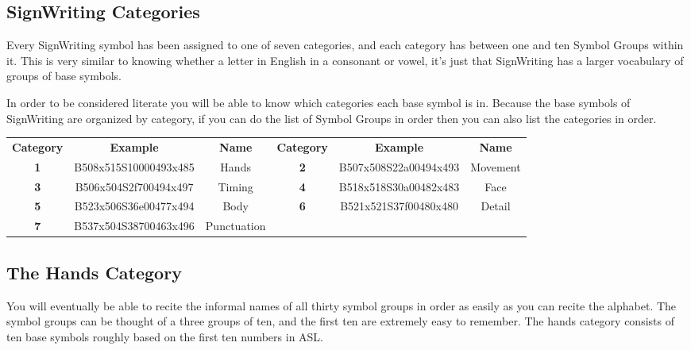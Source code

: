 \documentclass{article}
\begin{document}
\subsection{SignWriting Categories}

Every SignWriting symbol has been assigned to one of seven categories, and each category has between one and ten Symbol Groups within it.
This is very similar to knowing whether a letter in English in a consonant or vowel, it's just that SignWriting has a larger vocabulary of groups of base symbols.

In order to be considered literate you will be able to know which categories each base symbol is in.
Because the base symbols of SignWriting are organized by category, if you can do the list of Symbol Groups in order then you can also list the categories in order.

\begin{center}
\begin{tabular}{ccc@{\hskip 2cm}ccc}
\textbf{Category}&\textbf{Example}&\textbf{Name}&\textbf{Category}&\textbf{Example}&\textbf{Name}\\
\textbf{1}&B508x515S10000493x485&Hands      &\textbf{2}&B507x508S22a00494x493&Movement\\
\textbf{3}&B506x504S2f700494x497&Timing     &\textbf{4}&B518x518S30a00482x483&Face    \\
\textbf{5}&B523x506S36e00477x494&Body       &\textbf{6}&B521x521S37f00480x480&Detail     \\
\textbf{7}&B537x504S38700463x496&Punctuation\\
\end{tabular}
\end{center}

\subsection{The Hands Category}

You will eventually be able to recite the informal names of all thirty symbol groups in order as easily as you can recite the alphabet.
The symbol groups can be thought of a three groups of ten, and the first ten are extremely easy to remember.
The hands category consists of ten base symbols roughly based on the first ten numbers in ASL.
\end{document}

